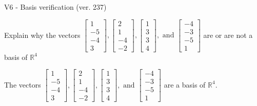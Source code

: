 \begin{exercise}
  \begin{exerciseTitle}V6 - Basis verification (ver. 237)\end{exerciseTitle}
  \begin{exerciseStatement}
    Explain why the vectors \(\left[\begin{array}{r}
1 \\
-5 \\
-4 \\
3
\end{array}\right] , \left[\begin{array}{r}
2 \\
1 \\
-4 \\
-2
\end{array}\right] , \left[\begin{array}{r}
1 \\
3 \\
3 \\
4
\end{array}\right] , \text{ and } \left[\begin{array}{r}
-4 \\
-3 \\
-5 \\
1
\end{array}\right]\) are or are not a basis of \(\mathbb{R}^4\)	


  \end{exerciseStatement}
  \begin{exerciseAnswer}
   The vectors \(\left[\begin{array}{r}
1 \\
-5 \\
-4 \\
3
\end{array}\right] , \left[\begin{array}{r}
2 \\
1 \\
-4 \\
-2
\end{array}\right] , \left[\begin{array}{r}
1 \\
3 \\
3 \\
4
\end{array}\right] , \text{ and } \left[\begin{array}{r}
-4 \\
-3 \\
-5 \\
1
\end{array}\right]\) 
  	 are  a basis of \(\mathbb{R}^4\).
  


  \end{exerciseAnswer}
\end{exercise}